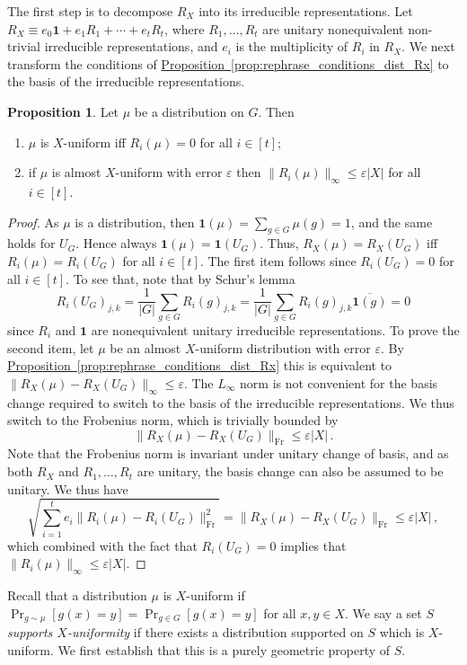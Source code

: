 \documentclass[10pt]{article}
\theoremstyle{definition}
\newtheorem{proposition}[theorem]{Proposition}
\numberwithin{equation}{section}
\newcommand{\expref}[2]{\texorpdfstring{\hyperref[#2]{#1~\ref{#2}}}{#1~\ref{#2}}}
\def\eps{\varepsilon}
\def\one{\mathbf{1}}
\def\Fr{\textrm{Fr}}
\begin{document}
The first step is to decompose $R_X$ into its irreducible
representations. Let $R_X \equiv e_0 \one + e_1 R_1 + \cdots + e_t R_t$,
where $R_1,\ldots,R_t$ are unitary nonequivalent non-trivial irreducible
representations, and $e_i$ is the multiplicity of $R_i$ in $R_X$. We next
transform the conditions of \expref{Proposition}{prop:rephrase_conditions_dist_Rx}
to the basis of the irreducible representations.

\begin{proposition}\label{prop:rephrase_conditions_dist_irr}
Let $\mu$ be a distribution on $G$. Then
\begin{enumerate}
\item $\mu$ is $X$-uniform iff $R_i(\mu) = 0$ for all $i \in [t]$;
\item if $\mu$ is almost $X$-uniform with error
$\eps$ then $\|R_i(\mu)\|_{\infty} \le \eps |X|$ for all $i \in [t]$.
\end{enumerate}
\end{proposition}

\begin{proof}
As $\mu$ is a distribution, then $\one(\mu) =
\sum_{g \in G}\mu(g)=1$, and the same holds for $U_G$. Hence always
$\one(\mu)=\one(U_G)$. Thus, $R_X(\mu)=R_X(U_G)$ iff $R_i(\mu)=R_i(U_G)$
for all $i \in [t]$. The first item follows since $R_i(U_G)=0$ for all
$i \in [t]$. To see that, note that by Schur's lemma $$ R_i(U_G)_{j,k}
= \frac{1}{|G|} \sum_{g \in G} R_i(g)_{j,k} = \frac{1}{|G|} \sum_{g
\in G} R_i(g)_{j,k} \overline{\one(g)} = 0 $$ since $R_i$ and $\one$
are nonequivalent unitary irreducible representations. To prove the
second item, let $\mu$ be an almost $X$-uniform distribution with
error $\eps$. By \expref{Proposition}{prop:rephrase_conditions_dist_Rx} this is
equivalent to $\|R_X(\mu)-R_X(U_G)\|_{\infty} \le \eps$. The $L_{\infty}$
norm is not convenient for the basis change required to switch to the
basis of the irreducible representations. We thus switch to the Frobenius
norm, which is trivially bounded by $$\|R_X(\mu)-R_X(U_G)\|_{\Fr}
\le \eps |X|\,.$$ Note that the Frobenius norm is invariant under
unitary change of basis, and as both $R_X$ and $R_1,\ldots,R_t$
are unitary, the basis change can also be assumed to be unitary. We
thus have $$ \sqrt{\sum_{i=1}^t e_i \|R_i(\mu)-R_i(U_G)\|^2_{\Fr}} =
\|R_X(\mu)-R_X(U_G)\|_{\Fr} \le \eps |X|\,,$$ which combined with the
fact that $R_i(U_G)=0$ implies that $\|R_i(\mu)\|_{\infty} \le \eps |X|$.
\end{proof}
\setcounter{section}{4}\setcounter{theorem}{0}
Recall that a distribution $\mu$ is $X$-uniform if $\Pr_{g \sim
\mu}[g(x)=y]=\Pr_{g \in G}[g(x)=y]$ for all $x,y \in X$. We say a set $S$
\emph{supports $X$-uniformity} if there exists a distribution supported on
$S$ which is $X$-uniform. We first establish that this is a purely geometric
property of $S$.
\end{document}
